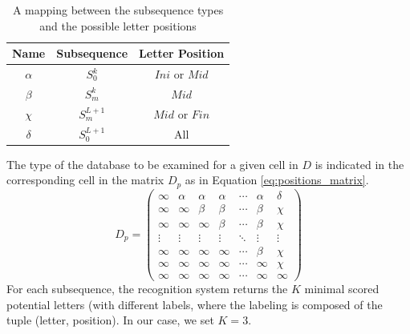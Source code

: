 \documentclass[10pt, conference, compsocconf]{IEEEtran}
\begin{document}
\begin{table}
\centering
\renewcommand{\arraystretch}{1.3}
\caption{A mapping between the subsequence types and the possible letter positions}
\begin{tabular}{| c |c | c |}
\hline
  Name     & Subsequence    & Letter Position       \\
\hline
  $\alpha$ & $S_0^{k}$         & $Ini$ or $Mid$  \\
\hline
  $\beta$  & $S_{m}^{k}$     & $Mid$              \\
\hline
  $\chi$    & $S_{m}^{L+1}$ & $Mid$ or $Fin$   \\
\hline
  $\delta$ & $S_0^{L+1}$     & All                   \\
\hline
\end{tabular}
\label{table:subsequences_types}
\end{table}

The type of the database to be examined for a given cell in $D$ is indicated in the corresponding cell in the matrix $D_p$ as in Equation \ref{eq:positions_matrix}. \\

\begin{equation}
D_{p}=
\left( 
\begin{array}{ccccccc}
\infty 	& \alpha & \alpha & \alpha  & \cdots & \alpha & \delta \\
\infty  & \infty  & \beta   & \beta   & \cdots  & \beta  & \chi    \\
\infty  & \infty  & \infty   & \beta   & \cdots  & \beta  & \chi    \\
\vdots & \vdots & \vdots  & \vdots & \ddots  & \vdots & \vdots \\
\infty  & \infty  & \infty   & \infty   & \cdots  & \beta  & \chi    \\
\infty  & \infty  & \infty   & \infty   & \cdots  & \infty  & \chi    \\
\infty  & \infty  & \infty   & \infty   & \cdots  & \infty  & \infty \end{array} \right)
\label{eq:positions_matrix}
\end{equation}
For each subsequence, the recognition system returns the $K$ minimal scored potential letters (with different labels, where the labeling is composed of the tuple (letter, position). In our case, we set $K=3$.\\
\end{document}
